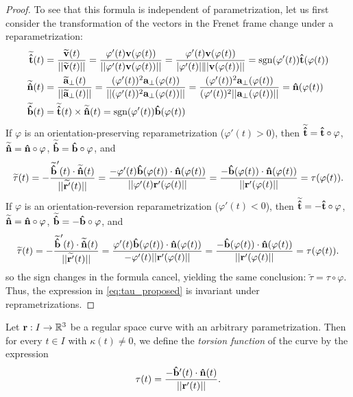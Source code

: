 \documentclass[12pt,letterpaper,reqno]{article}
\numberwithin{equation}{section}
\newcommand{\bv}{{\bf v}}
\newcommand{\ba}{{\bf a}}
\newcommand{\bbr}{{\bf r}}
\newcommand{\ut}{{\bf {\hat{t}}}}
\newcommand{\un}{{\bf {\hat{n}}}}
\newcommand{\ub}{{\bf {\hat{b}}}}
\begin{document}
{\begin{proof}
	To see that this formula is independent of parametrization, let us first consider the transformation of the vectors in the Frenet frame change under a reparametrization:
	\begin{align*}
		\widetilde{\ut}(t)&=\frac{\widetilde{\bv}(t)}{||\widetilde{\bv}(t)||}=\frac{\varphi'(t)\bv(\varphi(t))}{||\varphi'(t)\bv(\varphi(t))||}=\frac{\varphi'(t)\bv(\varphi(t))}{|\varphi'(t)|\||\bv(\varphi(t))||}=\text{sgn}(\varphi'(t))\ut(\varphi(t)) \\
		\widetilde{\un}(t)&=\frac{\widetilde{\ba}_\perp(t)}{||\widetilde{\ba}_\perp(t)||}=\frac{(\varphi'(t))^2\ba_\perp(\varphi(t))}{||(\varphi'(t))^2\ba_\perp(\varphi(t))||}=\frac{(\varphi'(t))^2\ba_\perp(\varphi(t))}{(\varphi'(t))^2||\ba_\perp(\varphi(t))||}=\un(\varphi(t)) \\
		\widetilde{\ub}(t)&=\widetilde{\ut}(t) \times \widetilde{\un}(t)=\text{sgn}(\varphi'(t))\ub(\varphi(t))
	\end{align*}
If $\varphi$ is an orientation-preserving reparametrization ($\varphi'(t)>0$), then $\widetilde{\ut}=\ut \circ \varphi$, $\widetilde{\un}=\un \circ \varphi$, $\widetilde{\ub}=\ub \circ \varphi$, and 
\begin{align*}
	\widetilde{\tau}(t)=-\frac{\widetilde{\ub}'(t)\cdot \widetilde{\un}(t)}{||\widetilde{\bbr'}(t)||}=\frac{-\varphi'(t)\ub(\varphi(t))\cdot \un(\varphi(t))}{||\varphi'(t)\bbr'(\varphi(t)||}=\frac{-\ub(\varphi(t))\cdot \un(\varphi(t))}{||\bbr'(\varphi(t)||}=\tau(\varphi(t)).
\end{align*}
If $\varphi$ is an orientation-reversion reparametrization ($\varphi'(t)<0$), then $\widetilde{\ut}=-\ut \circ \varphi$, $\widetilde{\un}=\un \circ \varphi$, $\widetilde{\ub}=-\ub \circ \varphi$, and 
\begin{align*}
	\widetilde{\tau}(t)=-\frac{\widetilde{\ub}'(t)\cdot \widetilde{\un}(t)}{||\widetilde{\bbr'}(t)||}=\frac{\varphi'(t)\ub(\varphi(t))\cdot \un(\varphi(t))}{-\varphi'(t)||\bbr'(\varphi(t)||}=\frac{-\ub(\varphi(t))\cdot \un(\varphi(t))}{||\bbr'(\varphi(t)||}=\tau(\varphi(t)).
\end{align*} 
so the sign changes in the formula cancel, yielding the same conclusion: $\widetilde{\tau}=\tau \circ \varphi$. Thus, the expression in \eqref{eq:tau_proposed} is invariant under reprametrizations. 
\end{proof}

\begin{defn}
	Let $\bbr:I \to \mathbb{R}^3$ be a regular space curve with an arbitrary parametrization. Then for every $t \in I$ with $\kappa(t) \neq 0$, we define the \emph{torsion function} of the curve by the expression
	\begin{align}\label{eq:tau_proposed}
		\tau(t)=\frac{-\ub'(t) \cdot \un(t)}{||\bbr'(t)||}.
	\end{align}	
\end{defn}

}
\end{document}
